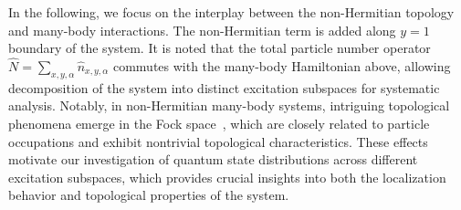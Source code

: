 \documentclass[longbibliography, aps, prx, amsmath, amssymb, amsfonts, twocolumn,superscriptaddress, footinbib]{revtex4-1}
\begin{document}


	In the following, we focus on the interplay between the non-Hermitian topology and many-body interactions. The non-Hermitian term is added along $y=1$ boundary of the system. It is noted that the
	total particle number operator $\hat{N} = \sum_{x,y,\alpha} \hat{n}_{x,y,\alpha}$ commutes with the many-body Hamiltonian above, 
	allowing decomposition of the system into distinct excitation subspaces for systematic analysis. 
	Notably, in non-Hermitian many-body systems, intriguing topological phenomena emerge in the Fock space~\cite{shen2024enhanced,shimomura2024general,deng2022observing}, which are closely related to particle occupations and exhibit nontrivial topological characteristics. 
	These effects motivate our investigation of quantum state distributions across different excitation subspaces, which provides crucial insights into both the localization behavior and topological properties of the system.

\end{document}

